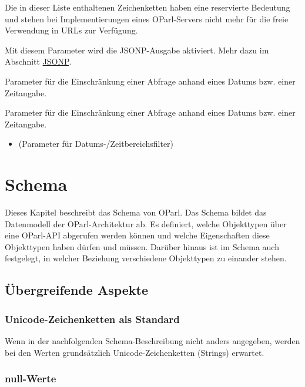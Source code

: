 \documentclass[,a4paper]{article}
\begin{document}
Die in dieser Liste enthaltenen Zeichenketten haben eine reservierte
Bedeutung und stehen bei Implementierungen eines OParl-Servers nicht
mehr für die freie Verwendung in URLs zur Verfügung.

\begin{description}
\itemsep1pt\parskip0pt
\item[callback:]
Mit diesem Parameter wird die JSONP-Ausgabe aktiviert. Mehr dazu im
Abschnitt \hyperref[jsonp]{JSONP}.
\item[startdate:]
Parameter für die Einschränkung einer Abfrage anhand eines Datums bzw.
einer Zeitangabe.
\item[enddate:]
Parameter für die Einschränkung einer Abfrage anhand eines Datums bzw.
einer Zeitangabe.
\end{description}

\begin{itemize}
\itemsep1pt\parskip0pt
\item
  (Parameter für Datums-/Zeitbereichsfilter)
\end{itemize}

\section{Schema}\label{schema}

Dieses Kapitel beschreibt das Schema von OParl. Das Schema bildet das
Datenmodell der OParl-Architektur ab. Es definiert, welche Objekttypen
über eine OParl-API abgerufen werden können und welche Eigenschaften
diese Objekttypen haben dürfen und müssen. Darüber hinaus ist im Schema
auch festgelegt, in welcher Beziehung verschiedene Objekttypen zu
einander stehen.

\subsection{Übergreifende Aspekte}\label{uxfcbergreifende-aspekte}

\subsubsection{Unicode-Zeichenketten als
Standard}\label{unicode-zeichenketten-als-standard}

Wenn in der nachfolgenden Schema-Beschreibung nicht anders angegeben,
werden bei den Werten grundsätzlich Unicode-Zeichenketten (Strings)
erwartet.

\subsubsection{null-Werte}\label{null-werte}
\end{document}
